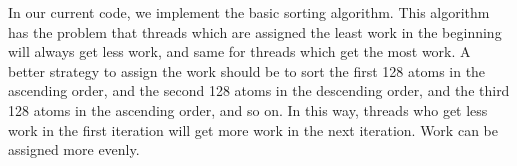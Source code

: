 In our current code, we implement the basic sorting algorithm. This algorithm has the problem that threads which are assigned the least work in the beginning will always
get less work, and same for threads which get the most work. A better strategy to assign the work should be to sort the first 128 atoms in the ascending order,
and the second 128 atoms in the descending order, and the third 128 atoms in the ascending order, and so on. In this way, threads who get less work in the first
iteration will get more work in the next iteration. Work can be assigned more evenly.
